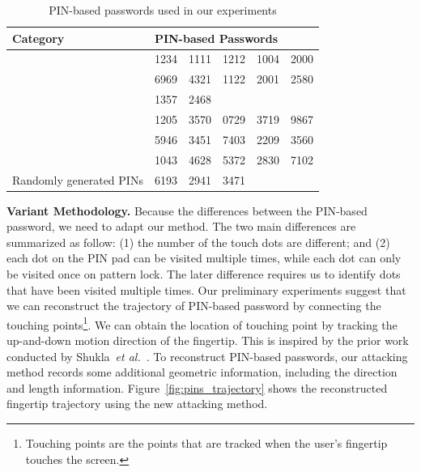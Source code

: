     \begin{table}[!t]
            \centering
            \caption{PIN-based passwords used in our experiments}
            \label{tab:PIN-based passwords}
            \small
            \begin{tabular}{llllll}
                \toprule
                Category & \multicolumn{5}{l}{PIN-based Passwords}\\
                \midrule
                \rowcolor{gray!10}  & 1234 & 1111 & 1212 & 1004 & 2000 \\
                \rowcolor{gray!10}  & 6969 & 4321 & 1122 & 2001 & 2580 \\
               \rowcolor{gray!10}   \multirow{-3}{*}{Commonly used PINs} & 1357 & 2468 &      &      & \\
                                    & 1205 & 3570 &  0729 & 3719 & 9867 \\
                                    & 5946 & 3451 &  7403 & 2209 & 3560 \\
                                    & 1043 & 4628 & 5372  & 2830 & 7102 \\
               \multirow{-4}{*}{Randomly generated PINs} & 6193 & 2941 & 3471  &      & \\
                \bottomrule
            \end{tabular}
    \end{table}

        \vspace{2mm}
        \noindent \textbf{Variant Methodology.} Because the differences
        between the PIN-based password, we need to adapt our method. The two
        main differences are summarized as follow: (1) the number of the
        touch dots are different; and (2) each dot on the PIN pad can be
        visited multiple times, while each dot can only be visited once on
        pattern lock. The later difference requires us to identify dots that
        have been visited multiple times.  Our preliminary experiments
        suggest that we can reconstruct the trajectory of PIN-based password
        by connecting the touching points\footnote{Touching points are the
        points that are tracked when the user's fingertip touches the screen.}. We
        can obtain the location of touching point by tracking the up-and-down
        motion direction of the fingertip. This is inspired by the prior work
        conducted by Shukla~\emph{et al.}~\cite{shukla2014beware}. To reconstruct
        PIN-based passwords, our attacking method records some additional
        geometric information, including the direction and length
        information. Figure~\ref{fig:pins_trajectory} shows the reconstructed
        fingertip trajectory using the new attacking method.

